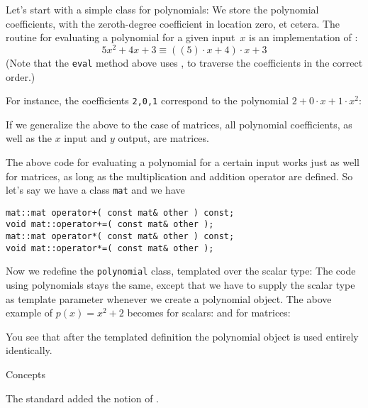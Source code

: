 Let's start with a simple class for polynomials:
%
%
We store the polynomial coefficients, with the
zeroth-degree coefficient in location zero, et cetera.
The routine for evaluating a polynomial for a given input~$x$
is an implementation of :
\[ 5 x^2 +4x +3 \equiv ( ( 5 ) \cdot x + 4 ) \cdot x + 3 \]
(Note that the \lstinline{eval} method above
uses ,  to traverse
the coefficients in the correct order.)

For instance, the coefficients \lstinline{2,0,1} correspond
to the polynomial $2+0\cdot x+1\cdot x^2$:
%

If we generalize the above to the case of matrices,
all polynomial coefficients, as well as the $x$ input and $y$ output,
are matrices.

The above code for evaluating a polynomial for a certain input
works just as well for matrices, as long as the multiplication and
addition operator are defined.
So let's say we have a class \lstinline{mat} and we have
\begin{lstlisting}
mat::mat operator+( const mat& other ) const;
void mat::operator+=( const mat& other );
mat::mat operator*( const mat& other ) const;
void mat::operator*=( const mat& other );
\end{lstlisting}

Now we redefine the \lstinline{polynomial} class,
templated over the scalar type:
%
%
The code using polynomials stays the same, except that we
have to supply the scalar type as template parameter
whenever we create a polynomial object.
The above example of $p(x)=x^2+2$ becomes
for scalars:
%
%
and for matrices:
%

You see that after the templated definition
the polynomial object is used entirely identically.

 {Concepts}
\label{sec:cpp-concepts}

The  standard added the notion of .

